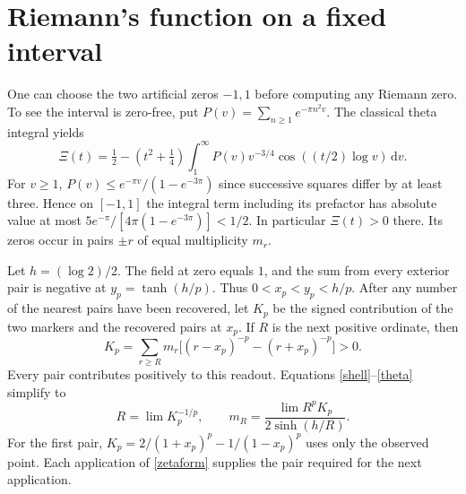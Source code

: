 \documentclass[11pt,letterpaper]{article}
\newcommand{\dd}{\mathrm d}
\numberwithin{equation}{section}
\begin{document}
\section{Riemann's function on a fixed interval}
One can choose the two artificial zeros $-1,1$ before computing
any Riemann zero. To see the interval is zero-free, put
$P(v)=\sum_{n\ge1}e^{-\pi n^2v}$. The classical theta integral yields
\[
 \Xi(t)=\tfrac12-(t^2+\tfrac14)
      \int_1^\infty P(v)v^{-3/4}\cos((t/2)\log v)\,\dd v .
\]
For $v\ge1$, $P(v)\le e^{-\pi v}/(1-e^{-3\pi})$ since successive
squares differ by at least three. Hence on $[-1,1]$ the integral term
including its prefactor has absolute value at most
$5e^{-\pi}/[4\pi(1-e^{-3\pi})]<1/2$. In particular $\Xi(t)>0$ there.
Its zeros occur in pairs $\pm r$ of equal multiplicity $m_r$.

Let $h=(\log2)/2$. The field at zero equals $1$, and the sum from every
exterior pair is negative at $y_p=\tanh(h/p)$. Thus $0<x_p<y_p<h/p$.
After any number of the nearest pairs have been recovered, let $K_p$ be
the signed contribution of the two markers and the recovered pairs at
$x_p$. If $R$ is the next positive ordinate, then
\begin{equation}\label{positive}
 K_p=\sum_{r\ge R}m_r\big[(r-x_p)^{-p}-(r+x_p)^{-p}\big]>0.
\end{equation}
Every pair contributes positively to this readout.
Equations \eqref{shell}--\eqref{theta} simplify to
\begin{equation}\label{zetaform}
 R=\lim K_p^{-1/p},\qquad
 m_R=\frac{\lim R^pK_p}{2\sinh(h/R)} .
\end{equation}
For the first pair, $K_p=2/(1+x_p)^p-1/(1-x_p)^p$ uses only the
observed point. Each application of \eqref{zetaform} supplies the pair
required for the next application.
\end{document}
